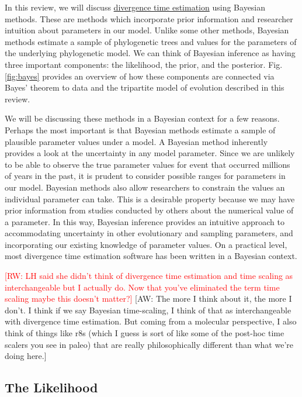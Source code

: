 \documentclass[11pt]{article}
\newcommand{\rw}[1]{{\textcolor{red}{[RW: #1]}}} %
\newcommand{\aw}[1]{{\textcolor{armygreen}{[AW: #1]}}} %
\begin{document}
In this review, we will discuss \underline{divergence time estimation} using Bayesian methods. 
These are methods which incorporate prior information and researcher intuition about parameters in our model.
Unlike some other methods, Bayesian methods estimate a sample of phylogenetic trees and values for the parameters of the underlying phylogenetic model.
We can think of Bayesian inference as having three important components: the likelihood, the prior, and the posterior.
Fig. \ref{fig:bayes} provides an overview of how these components are connected via Bayes' theorem to data and the tripartite model of evolution described in this review.

We will be discussing these methods in a Bayesian context for a few reasons.
Perhaps the most important is that Bayesian methods estimate a sample of plausible parameter values under a model. 
A Bayesian method inherently provides a look at the uncertainty in any model parameter.
Since we are unlikely to be able to observe the true parameter values for event that occurred millions of years in the past, it is prudent to consider possible ranges for parameters in our model.
Bayesian methods also allow researchers to constrain the values an individual parameter can take. 
This is a desirable property because we may have prior information from studies conducted by others about the numerical value of a parameter.
In this way, Bayesian inference provides an intuitive approach to accommodating uncertainty in other evolutionary and sampling parameters, and incorporating our existing knowledge of parameter values.
On a practical level, most divergence time estimation software has been written in a Bayesian context.

\rw{LH said she didn't think of divergence time estimation and time scaling as interchangeable but I actually do. Now that you've eliminated the term time scaling maybe this doesn't matter?}
\aw{The more I think about it, the more I don't. I think if we say Bayesian time-scaling, I think of that as interchangeable with divergence time estimation. But coming from a molecular perspective, I also think of things like r8s (which I guess is sort of like some of the post-hoc time scalers you see in paleo) that are really philosophically different than what we're doing here.}

\subsection{The Likelihood}
\end{document}
